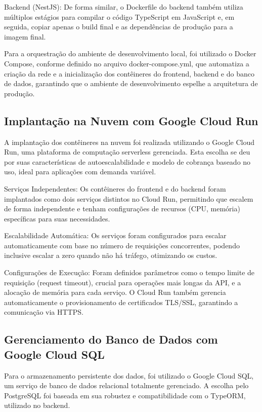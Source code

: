 Backend (NestJS): De forma similar, o Dockerfile do backend também utiliza múltiplos estágios para compilar o código TypeScript em JavaScript e, em seguida, copiar apenas o build final e as dependências de produção para a imagem final.

Para a orquestração do ambiente de desenvolvimento local, foi utilizado o Docker Compose, conforme definido no arquivo docker-compose.yml, que automatiza a criação da rede e a inicialização dos contêineres do frontend, backend e do banco de dados, garantindo que o ambiente de desenvolvimento espelhe a arquitetura de produção.

\subsection{Implantação na Nuvem com Google Cloud Run}

A implantação dos contêineres na nuvem foi realizada utilizando o Google Cloud Run, uma plataforma de computação serverless gerenciada. Esta escolha se deu por suas características de autoescalabilidade e modelo de cobrança baseado no uso, ideal para aplicações com demanda variável.

Serviços Independentes: Os contêineres do frontend e do backend foram implantados como dois serviços distintos no Cloud Run, permitindo que escalem de forma independente e tenham configurações de recursos (CPU, memória) específicas para suas necessidades.

Escalabilidade Automática: Os serviços foram configurados para escalar automaticamente com base no número de requisições concorrentes, podendo inclusive escalar a zero quando não há tráfego, otimizando os custos.

Configurações de Execução: Foram definidos parâmetros como o tempo limite de requisição (request timeout), crucial para operações mais longas da API, e a alocação de memória para cada serviço. O Cloud Run também gerencia automaticamente o provisionamento de certificados TLS/SSL, garantindo a comunicação via HTTPS.

\subsection{Gerenciamento do Banco de Dados com Google Cloud SQL}

Para o armazenamento persistente dos dados, foi utilizado o Google Cloud SQL, um serviço de banco de dados relacional totalmente gerenciado. A escolha pelo PostgreSQL foi baseada em sua robustez e compatibilidade com o TypeORM, utilizado no backend.


